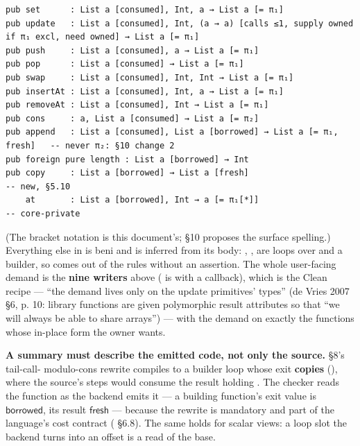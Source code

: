 \begin{Verbatim}
pub set      : List a [consumed], Int, a → List a [= π₁]
pub update   : List a [consumed], Int, (a → a) [calls ≤1, supply owned if π₁ excl, need owned] → List a [= π₁]
pub push     : List a [consumed], a → List a [= π₁]
pub pop      : List a [consumed] → List a [= π₁]
pub swap     : List a [consumed], Int, Int → List a [= π₁]
pub insertAt : List a [consumed], Int, a → List a [= π₁]
pub removeAt : List a [consumed], Int → List a [= π₁]
pub cons     : a, List a [consumed] → List a [= π₂]
pub append   : List a [consumed], List a [borrowed] → List a [= π₁, fresh]   -- never π₂: §10 change 2
pub foreign pure length : List a [borrowed] → Int
pub copy     : List a [borrowed] → List a [fresh]                            -- new, §5.10
    at       : List a [borrowed], Int → a [= π₁[*]]                          -- core-private
\end{Verbatim}

(The bracket notation is this document's; §10 proposes the surface spelling.) Everything else in  is beni and is inferred from its body: , ,  are loops over  and a builder, so  comes out of the rules without an assertion. The whole user-facing demand is the \textbf{nine writers} above ( is  with a callback), which is the Clean recipe — “the demand lives only on the update primitives' types” (de Vries 2007 §6, p. 10: library functions are given polymorphic result attributes so that “we will always be able to share arrays”) — with the demand on exactly the functions whose in-place form the owner wants.

\textbf{A summary must describe the emitted code, not only the source.}  §8's tail-call- modulo-cons rewrite compiles  to a builder loop whose exit \textbf{copies}  (), where the source's  steps would consume the result holding . The checker reads the function as the backend emits it — a building function's exit value is $\mathsf{borrowed}$, its result $\mathsf{fresh}$ — because the rewrite is mandatory and part of the language's cost contract ( §6.8). The same holds for scalar views: a loop slot the backend turns into an offset is a read of the base.


